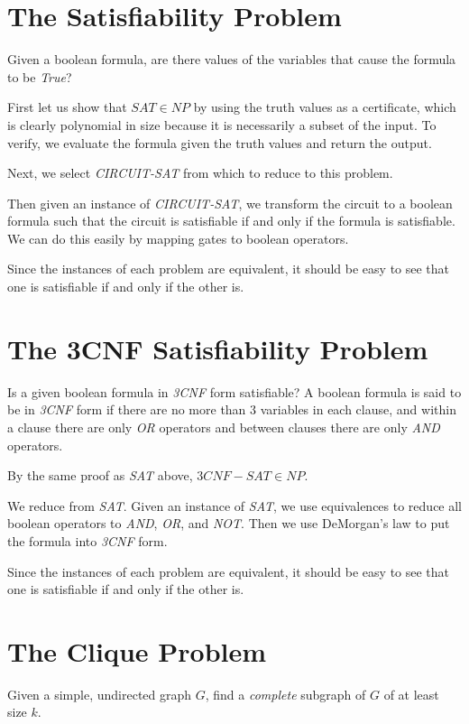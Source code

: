 \section{The Satisfiability Problem}

Given a boolean formula, are there values of the variables that cause
the formula to be \emph{True}?

First let us show that $SAT \in NP$ by using the truth values as a
certificate, which is clearly polynomial in size because it is
necessarily a subset of the input.  To verify, we evaluate the formula
given the truth values and return the output.

Next, we select \emph{CIRCUIT-SAT} from which to reduce to this
problem.

Then given an instance of \emph{CIRCUIT-SAT}, we transform the circuit
to a boolean formula such that the circuit is satisfiable if and only
if the formula is satisfiable.  We can do this easily by mapping gates
to boolean operators.

Since the instances of each problem are equivalent, it should be easy
to see that one is satisfiable if and only if the other is.

\section{The 3CNF Satisfiability Problem}

Is a given boolean formula in \emph{3CNF} form satisfiable?  A boolean
formula is said to be in \emph{3CNF} form if there are no more than
$3$ variables in each clause, and within a clause there are only
\emph{OR} operators and between clauses there are only \emph{AND}
operators.

By the same proof as \emph{SAT} above, $3CNF-SAT \in NP$.

We reduce from \emph{SAT}.  Given an instance of \emph{SAT}, we use
equivalences to reduce all boolean operators to \emph{AND}, \emph{OR},
and \emph{NOT}.  Then we use DeMorgan's law to put the formula into
\emph{3CNF} form.

Since the instances of each problem are equivalent, it should be easy
to see that one is satisfiable if and only if the other is.

\section{The Clique Problem}

Given a simple, undirected graph $G$, find a \emph{complete} subgraph
of $G$ of at least size $k$.

